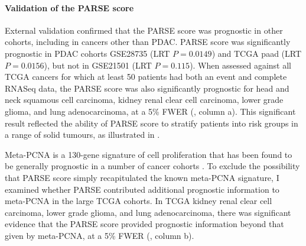 \documentclass[dissertation.tex]{subfiles}
\begin{document}
\paragraph{Validation of the \acrshort{PARSE} score}
External validation confirmed that the \gls{PARSE} score was prognostic in other cohorts, including in cancers other than \gls{PDAC}.  \Gls{PARSE} score was significantly prognostic in \gls{PDAC} cohorts GSE28735 \cite{Zhang2013} (LRT $P = 0.0149$) and \gls{TCGA} paad (LRT $P = 0.0156$), but not in GSE21501 \cite{Stratford2010} (LRT $P = 0.115$).  When assessed against all \gls{TCGA} cancers for which at least 50 patients had both an event and complete RNASeq data, the \gls{PARSE} score was also significantly prognostic for head and neck squamous cell carcinoma, kidney renal clear cell carcinoma, lower grade glioma, and lung adenocarcinoma, at a 5\% \gls{FWER} (, column a).  This significant result reflected the ability of \acrshort{PARSE} score to stratify patients into risk groups in a range of solid tumours, as illustrated in .

Meta-PCNA is a 130-gene signature of cell proliferation that has been found to be generally prognostic in a number of cancer cohorts \cite{Venet2011}.  To exclude the possibility that \gls{PARSE} score simply recapitulated the known meta-PCNA signature, I examined whether \gls{PARSE} contributed additional prognostic information to meta-PCNA in the large \gls{TCGA} cohorts.  In \gls{TCGA} kidney renal clear cell carcinoma, lower grade glioma, and lung adenocarcinoma, there was significant evidence that the \gls{PARSE} score provided prognostic information beyond that given by meta-PCNA, at a 5\% \gls{FWER} (, column b).
\end{document}
